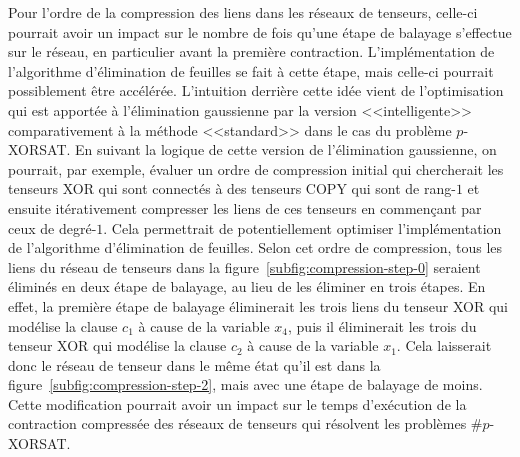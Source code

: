 Pour l'ordre de la compression des liens dans les réseaux de tenseurs, celle-ci pourrait avoir un impact sur le nombre de fois qu'une étape de balayage s'effectue sur le réseau, en particulier avant la première contraction.
L'implémentation de l'algorithme d'élimination de feuilles se fait à cette étape, mais celle-ci pourrait possiblement être accélérée.
L'intuition derrière cette idée vient de l'optimisation qui est apportée à l'élimination gaussienne par la version <<intelligente>> comparativement à la méthode <<standard>> dans le cas du problème $p$-XORSAT.
En suivant la logique de cette version de l'élimination gaussienne, on pourrait, par exemple, évaluer un ordre de compression initial qui chercherait les tenseurs XOR qui sont connectés à des tenseurs COPY qui sont de rang-$1$ et ensuite itérativement compresser les liens de ces tenseurs en commençant par ceux de degré-$1$.
Cela permettrait de potentiellement optimiser l'implémentation de l'algorithme d'élimination de feuilles.
Selon cet ordre de compression, tous les liens du réseau de tenseurs dans la figure~\ref{subfig:compression-step-0} seraient éliminés en deux étape de balayage, au lieu de les éliminer en trois étapes.
En effet, la première étape de balayage éliminerait les trois liens du tenseur XOR qui modélise la clause $c_1$ à cause de la variable $x_4$, puis il éliminerait les trois du tenseur XOR qui modélise la clause $c_2$ à cause de la variable $x_1$.
Cela laisserait donc le réseau de tenseur dans le même état qu'il est dans la figure~\ref{subfig:compression-step-2}, mais avec une étape de balayage de moins.
Cette modification pourrait avoir un impact sur le temps d'exécution de la contraction compressée des réseaux de tenseurs qui résolvent les problèmes \#$p$-XORSAT.

